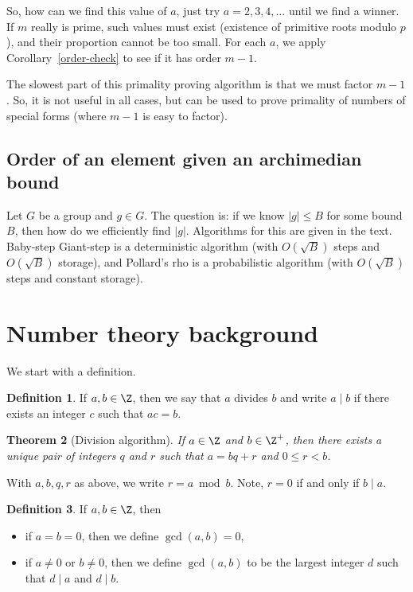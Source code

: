 \documentclass[12pt]{amsart}
\newcommand{\terminology}[1]{\textbf{\textit{#1}}}
\renewcommand{\terminology}[1]{#1}
\newcommand{\term}{\terminology}
\theoremstyle{plain}
\newtheorem{thm}{Theorem}[section]
\theoremstyle{definition}
\newtheorem{defn}[thm]{Definition}
\theoremstyle{remark}
\begin{document}
So, how can we find this value of $a$, just try $a=2, 3, 4, \ldots$
until we find a winner.  If $m$ really is prime, such values must
exist (existence of primitive roots modulo $p$), and their proportion
cannot be too small.  For each $a$, we apply
Corollary~\ref{order-check} to see if it has order $m-1$.

The slowest part of this primality proving algorithm is that we must
factor $m-1$.  So, it is not useful in all cases, but can be used to
prove primality of numbers of special forms (where $m-1$ is easy to
factor).


\subsection{Order of an element given an archimedian bound}

Let $G$ be a group and $g\in G$.  The question is: if we know
$|g|\leq B$ for some bound $B$, then how do we efficiently find
$|g|$. Algorithms for this are given in the text.  Baby-step
Giant-step is a deterministic algorithm (with $O(\sqrt{B})$ steps and
$O(\sqrt{B})$ storage), and Pollard's rho is a probabilistic algorithm
(with $O(\sqrt{B})$ steps and constant storage).

\section{Number theory background}

We start with a definition.
\begin{defn}\label{divides}
  If $a,b\in\Z$, then we say that $a$ \term{divides} $b$
  and write $a\mid b$ if there exists an integer $c$ such that $ac=b$.
\end{defn}

\begin{thm}[Division algorithm] \label{div-alg}
  If $a\in \Z$ and $b\in\Z^+$, then there exists a unique pair of integers $q$ and $r$
  such that $a=bq+r$ and $0\leq r<b$.
\end{thm}
With $a,b,q,r$ as above, we write $r=a\bmod b$.  Note, $r=0$ if and
only if $b\mid a$.

\begin{defn}
  If $a,b\in\Z$, then
  \begin{itemize}
  \item if $a=b=0$, then we define $\gcd(a,b)=0$,
  \item if $a\neq 0$ or $b\neq 0$, then we define $\gcd(a,b)$ to be
    the largest integer $d$ such that $d\mid a$ and $d\mid b$.
 \end{itemize}
 \end{defn}
\end{document}
